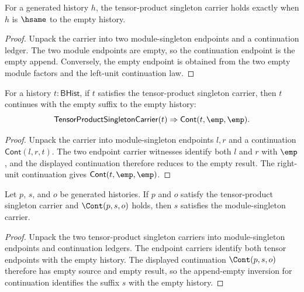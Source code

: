 \begin{theorem}
\label{thm:tensorproduct-singleton-carrier-empty-endpoint-iff}
For a generated history $h$, the tensor-product singleton carrier holds exactly
when $h$ is $\hsame$ to the empty history.
\end{theorem}
\begin{proof}
Unpack the carrier into two module-singleton endpoints and a continuation
ledger. The two module endpoints are empty, so the continuation endpoint is the
empty append. Conversely, the empty endpoint is obtained from the two empty
module factors and the left-unit continuation law.
\end{proof}

\begin{theorem}
\label{thm:tensorproduct-singleton-carrier-result-empty-continuation}
For a history $t:\mathsf{BHist}$, if $t$ satisfies the tensor-product
singleton carrier, then $t$ continues with the empty suffix to the empty
history:
$$
\mathsf{TensorProductSingletonCarrier}(t)\Rightarrow
\mathsf{Cont}(t,\emp,\emp).
$$
\end{theorem}
\begin{proof}
Unpack the carrier into module-singleton endpoints $l,r$ and a continuation
$\mathsf{Cont}(l,r,t)$. The two endpoint carrier witnesses identify both
$l$ and $r$ with $\emp$, and the displayed continuation therefore reduces to
the empty result. The right-unit continuation gives
$\mathsf{Cont}(t,\emp,\emp)$.
\end{proof}

\begin{theorem}\label{thm:tensorproduct-singleton-carrier-continuation-suffix-carrier}
Let $p$, $s$, and $o$ be generated histories. If $p$ and $o$ satisfy the
tensor-product singleton carrier and $\Cont(p,s,o)$ holds, then $s$ satisfies the
module-singleton carrier.
\end{theorem}
\begin{proof}
Unpack the two tensor-product singleton carriers into module-singleton endpoints
and continuation ledgers. The endpoint carriers identify both tensor endpoints with
the empty history. The displayed continuation $\Cont(p,s,o)$ therefore has empty
source and empty result, so the append-empty inversion for continuation identifies
the suffix $s$ with the empty history.
\end{proof}


